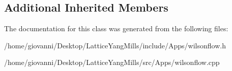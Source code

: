 \subsection*{Additional Inherited Members}


The documentation for this class was generated from the following files\+:\begin{DoxyCompactItemize}
\item 
/home/giovanni/\+Desktop/\+Lattice\+Yang\+Mills/include/\+Apps/wilsonflow.\+h\item 
/home/giovanni/\+Desktop/\+Lattice\+Yang\+Mills/src/\+Apps/wilsonflow.\+cpp\end{DoxyCompactItemize}
